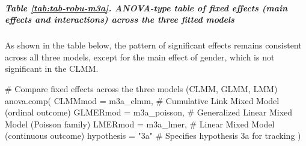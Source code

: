 \documentclass[
  bookmarksnumbered]{article}
\newenvironment{Shaded}{\begin{snugshade}}{\end{snugshade}}
\newcommand{\AttributeTok}[1]{\textcolor[rgb]{0.80,0.80,0.80}{#1}}
\newcommand{\CommentTok}[1]{\textcolor[rgb]{0.50,0.62,0.50}{#1}}
\newcommand{\FunctionTok}[1]{\textcolor[rgb]{0.94,0.94,0.56}{#1}}
\newcommand{\NormalTok}[1]{\textcolor[rgb]{0.80,0.80,0.80}{#1}}
\newcommand{\StringTok}[1]{\textcolor[rgb]{0.80,0.58,0.58}{#1}}
\begin{document}
\subparagraph{Table \ref{tab:tab-robu-m3a}. ANOVA-type table of fixed effects (main effects and interactions) across the three fitted models}\label{table-reftabtab-robu-m3a.-anova-type-table-of-fixed-effects-main-effects-and-interactions-across-the-three-fitted-models}

As shown in the table below, the pattern of significant effects remains consistent across all three models, except for the main effect of gender, which is not significant in the CLMM.

\begin{Shaded}
\begin{Highlighting}[]
\CommentTok{\# Compare fixed effects across the three models (CLMM, GLMM, LMM)}
\FunctionTok{anova.comp}\NormalTok{(}
  \AttributeTok{CLMMmod =}\NormalTok{ m3a\_clmm, }\CommentTok{\# Cumulative Link Mixed Model (ordinal outcome)}
  \AttributeTok{GLMERmod =}\NormalTok{ m3a\_poisson, }\CommentTok{\# Generalized Linear Mixed Model (Poisson family)}
  \AttributeTok{LMERmod =}\NormalTok{ m3a\_lmer, }\CommentTok{\# Linear Mixed Model (continuous outcome)}
  \AttributeTok{hypothesis =} \StringTok{"3a"} \CommentTok{\# Specifies hypothesis 3a for tracking}
\NormalTok{)}
\end{Highlighting}
\end{Shaded}
\end{document}
